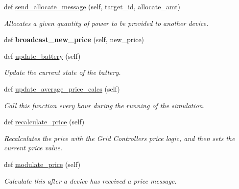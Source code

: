 \begin{DoxyCompactItemize}
def \hyperlink{class_build_1_1_objects_1_1grid__controller_1_1_grid_controller_a5ff206d2afccf703eef39dafadce5124}{send\+\_\+allocate\+\_\+message} (self, target\+\_\+id, allocate\+\_\+amt)
\begin{DoxyCompactList}\small\item\em Allocates a given quantity of power to be provided to another device. \end{DoxyCompactList}\item 
\mbox{\label{class_build_1_1_objects_1_1grid__controller_1_1_grid_controller_aada18b526f6576563d549b9efee182df}} 
def {\bfseries broadcast\+\_\+new\+\_\+price} (self, new\+\_\+price)
\item 
def \hyperlink{class_build_1_1_objects_1_1grid__controller_1_1_grid_controller_aa6a44013053b81ae9996aa21a44fac1d}{update\+\_\+battery} (self)
\begin{DoxyCompactList}\small\item\em Update the current state of the battery. \end{DoxyCompactList}\item 
def \hyperlink{class_build_1_1_objects_1_1grid__controller_1_1_grid_controller_a51734204cdfcff80c9ba18eacec07dde}{update\+\_\+average\+\_\+price\+\_\+calcs} (self)
\begin{DoxyCompactList}\small\item\em Call this function every hour during the running of the simulation. \end{DoxyCompactList}\item 
def \hyperlink{class_build_1_1_objects_1_1grid__controller_1_1_grid_controller_a59529d68b87e1814512a8c03d908d797}{recalculate\+\_\+price} (self)
\begin{DoxyCompactList}\small\item\em Recalculates the price with the Grid Controller\textquotesingle{}s price logic, and then sets the current price value. \end{DoxyCompactList}\item 
def \hyperlink{class_build_1_1_objects_1_1grid__controller_1_1_grid_controller_a8613a7012fcafee53dafc0abe1d71919}{modulate\+\_\+price} (self)
\begin{DoxyCompactList}\small\item\em Calculate this after a device has received a price message. \end{DoxyCompactList}\item 

\end{DoxyCompactItemize}
